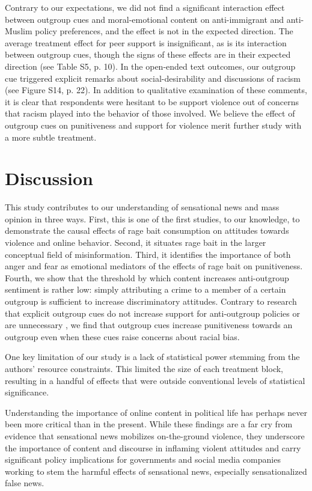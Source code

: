 Contrary to our expectations, we did not find a significant interaction effect between outgroup cues and moral-emotional content on anti-immigrant and anti-Muslim policy preferences, and the effect is not in the expected direction. The average treatment effect for peer support is insignificant, as is its interaction between outgroup cues, though the signs of these effects are in their expected direction (see Table S5, p. 10). In the open-ended text outcomes, our outgroup cue triggered explicit remarks about social-desirability and discussions of racism (see Figure S14, p. 22). In addition to qualitative examination of these comments, it is clear that respondents were hesitant to be support violence out of concerns that racism played into the behavior of those involved.  We believe the effect of outgroup cues on punitiveness and support for violence merit further study with a more subtle treatment.

\section{Discussion}

This study contributes to our understanding of sensational news and mass opinion in three ways. First, this is one of the first studies, to our knowledge, to demonstrate the causal effects of rage bait consumption on attitudes towards violence and online behavior. Second, it situates rage bait in the larger conceptual field of misinformation. Third, it identifies the importance of both anger and fear as emotional mediators of the effects of rage bait on punitiveness. Fourth, we show that the threshold by which content increases anti-outgroup sentiment is rather low: simply attributing a crime to a member of a certain outgroup is sufficient to increase discriminatory attitudes. Contrary to research that explicit outgroup cues do not increase support for anti-outgroup policies \citep{huber2006race,mendelberg2001race} or are unnecessary \citep{banks2016group}, we find that outgroup cues increase punitiveness towards an outgroup even when these cues raise concerns about racial bias.

One key limitation of our study is a lack of statistical power stemming from the authors' resource constraints. This limited the size of each treatment block, resulting in a handful of effects that were outside conventional levels of statistical significance.

Understanding the importance of online content in political life has perhaps never been more critical than in the present. While these findings are a far cry from evidence that sensational news mobilizes on-the-ground violence, they underscore the importance of content and discourse in inflaming violent attitudes and carry significant policy implications for governments and social media companies working to stem the harmful effects of sensational news, especially sensationalized false news. 

